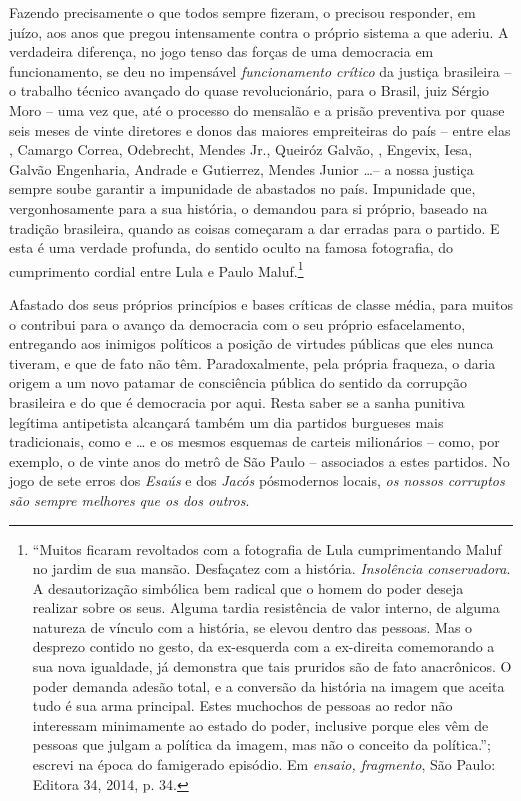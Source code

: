 Fazendo precisamente o que todos sempre fizeram, o  precisou
responder, em juízo, aos anos que pregou intensamente contra o próprio
sistema a que aderiu. A verdadeira diferença, no jogo tenso das forças
de uma democracia em funcionamento, se deu no impensável
\emph{funcionamento crítico} da justiça brasileira -- o trabalho técnico
avançado do quase revolucionário, para o Brasil, juiz Sérgio Moro -- uma
vez que, até o processo do mensalão e a prisão preventiva por quase seis
meses de vinte diretores e donos das maiores empreiteiras do país -- entre
elas , Camargo Correa, Odebrecht, Mendes Jr., Queiróz Galvão, ,
Engevix, Iesa, Galvão Engenharia, Andrade e Gutierrez, Mendes Junior
…-- a nossa justiça sempre soube garantir a impunidade de abastados no
país. Impunidade que, vergonhosamente para a sua história, o  demandou
para si próprio, baseado na tradição brasileira, quando as coisas
começaram a dar erradas para o partido. E esta é uma verdade profunda,
do sentido oculto na famosa fotografia, do cumprimento cordial entre
Lula e Paulo Maluf.\footnote{``Muitos ficaram revoltados com a
  fotografia de Lula cumprimentando Maluf no jardim de sua mansão.
  Desfaçatez com a história. \emph{Insolência conservadora}. A
  desautorização simbólica bem radical que o homem do poder deseja
  realizar sobre os seus. Alguma tardia resistência de valor interno, de
  alguma natureza de vínculo com a história, se elevou dentro das
  pessoas. Mas o desprezo contido no gesto, da ex-esquerda com a
  ex-direita comemorando a sua nova igualdade, já demonstra que tais
  pruridos são de fato anacrônicos. O poder demanda adesão total, e a
  conversão da história na imagem que aceita tudo é sua arma principal.
  Estes muchochos de pessoas ao redor não interessam minimamente ao
  estado do poder, inclusive porque eles vêm de pessoas que julgam a
  política da imagem, mas não o conceito da política.''; escrevi na
  época do famigerado episódio. Em \emph{ensaio, fragmento}, São Paulo:
  Editora 34, 2014, p. 34.}

Afastado dos seus próprios princípios e bases críticas de classe média,
para muitos o  contribui para o avanço da democracia com o seu próprio
esfacelamento, entregando aos inimigos políticos a posição de virtudes
públicas que eles nunca tiveram, e que de fato não têm. Paradoxalmente,
pela própria fraqueza, o  daria origem a um novo patamar de
consciência pública do sentido da corrupção brasileira e do que é
democracia por aqui. Resta saber se a sanha punitiva legítima
antipetista alcançará também um dia partidos burgueses mais
tradicionais, como  e … e os mesmos esquemas de carteis
milionários -- como, por exemplo, o de vinte anos do metrô de São Paulo
-- associados a estes partidos. No jogo de sete erros dos \emph{Esaús} e
dos \emph{Jacós} pósmodernos locais, \emph{os nossos corruptos são
sempre melhores que os dos outros}.


